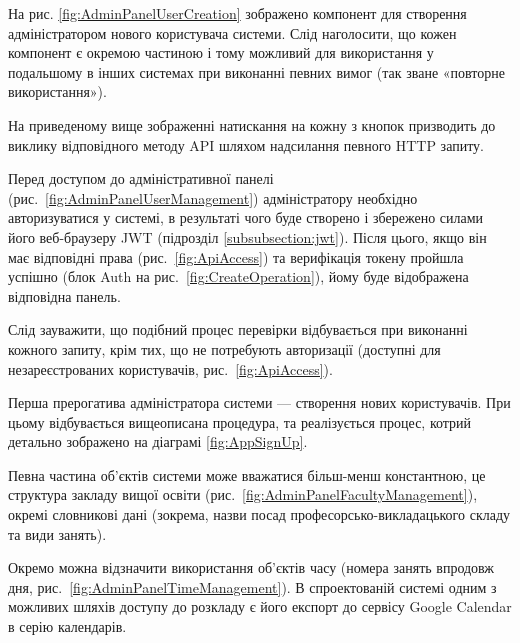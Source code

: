 На рис. \ref{fig:AdminPanelUserCreation} зображено компонент для створення адміністратором нового користувача системи. Слід наголосити, що кожен компонент є окремою частиною і тому можливий для використання у подальшому в інших системах при виконанні певних вимог (так зване «повторне використання»).


На приведеному вище зображенні натискання на кожну з кнопок призводить до виклику відповідного методу API шляхом надсилання певного HTTP запиту.

Перед доступом до адміністративної панелі (рис.~\ref{fig:AdminPanelUserManagement}) адміністратору необхідно авторизуватися у системі, в результаті чого буде створено і збережено силами його веб-браузеру JWT (підрозділ \ref{subsubsection:jwt}). Після цього, якщо він має відповідні права  (рис.~\ref{fig:ApiAccess}) та верифікація токену пройшла успішно (блок Auth на рис.~\ref{fig:CreateOperation}), йому буде відображена відповідна панель.


Слід зауважити, що подібний процес перевірки відбувається при виконанні кожного запиту, крім тих, що не потребують авторизації (доступні для незареєстрованих користувачів, рис.~\ref{fig:ApiAccess}).

Перша прерогатива адміністратора системи — створення нових користувачів. При цьому відбувається вищеописана процедура, та реалізується процес, котрий детально зображено на діаграмі \ref{fig:AppSignUp}.

Певна частина об’єктів системи може вважатися більш-менш константною, це структура закладу вищої освіти (рис.~\ref{fig:AdminPanelFacultyManagement}), окремі словникові дані (зокрема, назви посад професорсько-викладацького складу та види занять).


Окремо можна відзначити використання об’єктів часу (номера занять впродовж дня, рис.~\ref{fig:AdminPanelTimeManagement}).  В спроектованій системі одним з можливих шляхів доступу до розкладу є його експорт до сервісу Google Calendar в серію календарів. 


